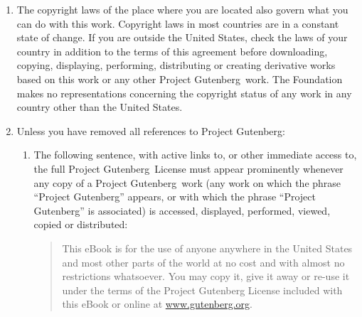 \documentclass[10pt,a4paper]{book}
\begin{document}
\begin{enumerate}[label=1.\Alph*., wide=0pt, leftmargin=*, align=left]
  \item The copyright laws of the place where you are located also govern what you can do with this work. Copyright laws in most countries are in a constant state of change. If you are outside the United States, check the laws of your country in addition to the terms of this agreement before downloading, copying, displaying, performing, distributing or creating derivative works based on this work or any other Project Gutenberg\texttrademark\ work. The Foundation makes no representations concerning the copyright status of any work in any country other than the United States.

  \item Unless you have removed all references to Project Gutenberg:
  \begin{enumerate}[label=\arabic*., wide=0pt, leftmargin=*, align=left]
    \item The following sentence, with active links to, or other immediate access to, the full Project Gutenberg\texttrademark\ License must appear prominently whenever any copy of a Project Gutenberg\texttrademark\ work (any work on which the phrase “Project Gutenberg” appears, or with which the phrase “Project Gutenberg” is associated) is accessed, displayed, performed, viewed, copied or distributed:
    \begin{quote}
    This eBook is for the use of anyone anywhere in the United States and most other parts of the world at no cost and with almost no restrictions whatsoever. You may copy it, give it away or re-use it under the terms of the Project Gutenberg License included with this eBook or online at \url{www.gutenberg.org}.
    \end{quote}
  \end{enumerate}
\end{enumerate}
\end{document}
